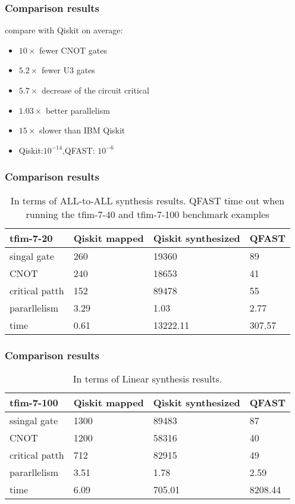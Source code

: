 \begin{frame}
\frametitle{Comparison results}
compare with Qiskit on average:
\begin{itemize}
  \item $10\times$ fewer CNOT gates
  \item $5.2\times$ fewer U3 gates
  \item $5.7\times$ decrease of the circuit critical
  \item $1.03\times$ better parallelism
  \item $15\times$ slower than IBM Qiskit
  \item Qiskit:$10^{-14}$,QFAST: $10^{-6}$
\end{itemize}
\end{frame}

\begin{frame}
  \frametitle{Comparison results}

  \begin{table}[]
    \begin{tabular}{l|lll}
    tfim-7-20  & Qiskit mapped & Qiskit synthesized & QFAST  \\\hline
    singal gate    & 260           & 19360              & 89     \\
    CNOT           & 240           & 18653              & 41     \\
    critical patth & 152           & 89478              & 55     \\
    pararllelism   & 3.29          & 1.03               & 2.77   \\
    time           & 0.61          & 13222.11           & 307.57
    \end{tabular}
    \caption{In terms of ALL-to-ALL synthesis results. QFAST time out when running the tfim-7-40 and tfim-7-100 benchmark examples}
    \end{table}
\end{frame}

\begin{frame}
  \frametitle{Comparison results}

  \begin{table}[]
    \begin{tabular}{l|lll}
    tfim-7-100  & Qiskit mapped & Qiskit synthesized & QFAST  \\\hline
    ssingal gate    & 1300          & 89483              & 87      \\
    CNOT           & 1200          & 58316              & 40      \\
    critical patth & 712           & 82915              & 49      \\
    pararllelism   & 3.51          & 1.78               & 2.59    \\
    time           & 6.09          & 705.01             & 8208.44
    \end{tabular}
    \caption{In terms of Linear synthesis results.}
    \end{table}
\end{frame}


